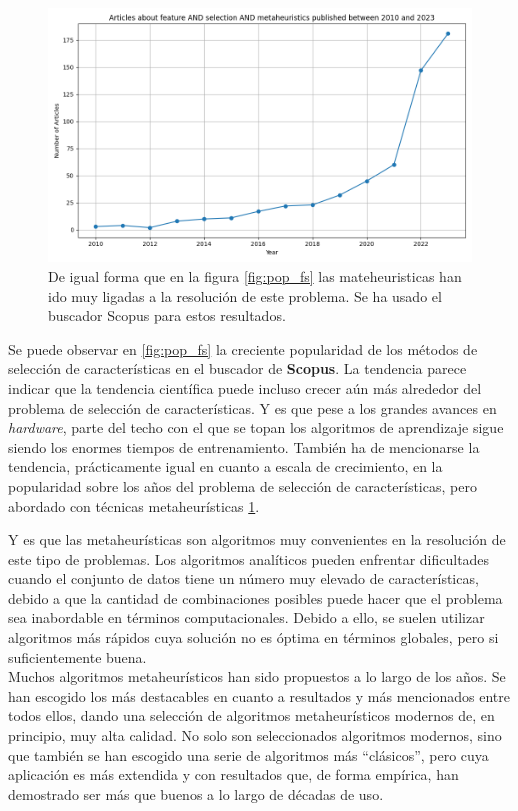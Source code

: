\begin{figure}[htp]
  \begin{center}
    \includegraphics[width=1\textwidth]{imagenes/scopus_chart2.png}
  \end{center}
  \caption[Popularidad de feature selection + metaheuristics sobre los años]{De igual forma que en la figura \ref{fig:pop_fs} las mateheuristicas han ido muy ligadas a la resolución de este problema. Se ha usado el buscador Scopus para estos resultados.}
  \label{fig:pop_fs2}
\end{figure}

Se puede observar en \ref{fig:pop_fs} la creciente popularidad de los métodos de selección de características en el buscador de \textbf{Scopus}. La tendencia parece indicar que la tendencia científica puede incluso crecer aún más alrededor del problema de selección de características. Y es que pese a los grandes avances en \textit{hardware}, parte del techo con el que se topan los algoritmos de aprendizaje sigue siendo los enormes tiempos de entrenamiento.
También ha de mencionarse la tendencia, prácticamente igual en cuanto a escala de crecimiento, en la popularidad sobre los años del problema de selección de características, pero abordado con técnicas metaheurísticas \ref{fig:pop_fs2}.

Y es que las metaheurísticas son algoritmos muy convenientes en la resolución de este tipo de problemas. Los algoritmos analíticos pueden enfrentar dificultades cuando el conjunto de datos tiene un número muy elevado de características, debido a que la cantidad de combinaciones posibles puede hacer que el problema sea inabordable en términos computacionales. Debido a ello, se suelen utilizar algoritmos más rápidos cuya solución no es óptima en términos globales, pero si suficientemente buena.\\[6pt]
Muchos algoritmos metaheurísticos han sido propuestos a lo largo de los años. Se han escogido los más destacables en cuanto a resultados y más mencionados entre todos ellos, dando una selección de algoritmos metaheurísticos modernos de, en principio, muy alta calidad. No solo son seleccionados algoritmos modernos, sino que también se han escogido una serie de algoritmos más ``clásicos'', pero cuya aplicación es más extendida y con resultados que, de forma empírica, han demostrado ser más que buenos a lo largo de décadas de uso.

